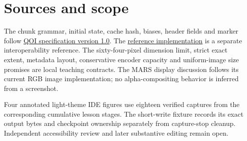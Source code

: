 \section{Sources and scope}
The chunk grammar, initial state, cache hash, biases, header fields and marker follow
\href{https://qoiformat.org/qoi-specification.pdf}{QOI specification version 1.0}.
The \href{https://github.com/phoboslab/qoi}{reference implementation} is a separate
interoperability reference. The sixty-four-pixel dimension limit, strict exact extent,
metadata layout, conservative encoder capacity and uniform-image size promises are
local teaching contracts. The MARS display discussion follows its current RGB image
implementation; no alpha-compositing behavior is inferred from a screenshot.

Four annotated light-theme IDE figures use eighteen verified captures from the
corresponding cumulative lesson stages. The short-write fixture records its exact
output bytes and checkpoint ownership separately from capture-stop cleanup.
Independent accessibility review and later substantive editing remain open.
